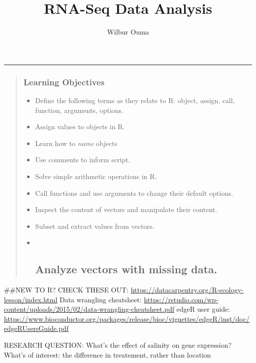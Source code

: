 \documentclass[
]{article}
\title{RNA-Seq Data Analysis}
\author{Wilbur Ouma}
\date{}
\begin{document}
\maketitle

\begin{center}\rule{0.5\linewidth}{0.5pt}\end{center}

\begin{quote}
\hypertarget{learning-objectives}{%
\subsubsection{Learning Objectives}\label{learning-objectives}}

\begin{itemize}
\item
  Define the following terms as they relate to R: object, assign, call,
  function, arguments, options.
\item
  Assign values to objects in R.
\item
  Learn how to \emph{name} objects
\item
  Use comments to inform script.
\item
  Solve simple arithmetic operations in R.
\item
  Call functions and use arguments to change their default options.
\item
  Inspect the content of vectors and manipulate their content.
\item
  Subset and extract values from vectors.
\item ~
  \hypertarget{analyze-vectors-with-missing-data.}{%
  \subsection{Analyze vectors with missing
  data.}\label{analyze-vectors-with-missing-data.}}
\end{itemize}
\end{quote}

\#\#NEW TO R? CHECK THESE OUT:
\url{https://datacarpentry.org/R-ecology-lesson/index.html} Data
wrangling cheatsheet:
\url{https://rstudio.com/wp-content/uploads/2015/02/data-wrangling-cheatsheet.pdf}
edgeR user guide:
\url{https://www.bioconductor.org/packages/release/bioc/vignettes/edgeR/inst/doc/edgeRUsersGuide.pdf}

RESEARCH QUESTION: What's the effect of salinity on gene expression?
What's of interest: the difference in treatement, rather than location
\end{document}
